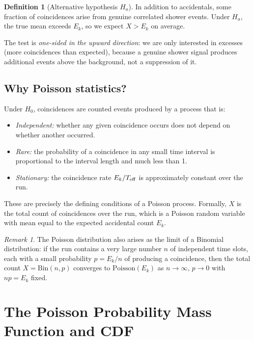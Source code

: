 \documentclass[12pt]{article}
\theoremstyle{definition}
\newtheorem{definition}{Definition}
\theoremstyle{remark}
\newtheorem{remark}{Remark}
\newcommand{\Ho}{H_0}
\newcommand{\Ha}{H_a}
\newcommand{\Eacc}{E}
\begin{document}
\begin{definition}[Alternative hypothesis $\Ha$]
  In addition to accidentals, some fraction of coincidences arise from
  genuine correlated shower events.  Under $\Ha$, the true mean exceeds
  $\Eacc_k$, so we expect $X > \Eacc_k$ on average.
\end{definition}

The test is \emph{one-sided in the upward direction}: we are only
interested in excesses (more coincidences than expected), because a
genuine shower signal produces additional events above the background,
not a suppression of it.

\subsection{Why Poisson statistics?}

Under $\Ho$, coincidences are counted events produced by a process that
is:
\begin{itemize}
  \item \textit{Independent:} whether any given coincidence occurs does
        not depend on whether another occurred.
  \item \textit{Rare:} the probability of a coincidence in any small
        time interval is proportional to the interval length and much
        less than 1.
  \item \textit{Stationary:} the coincidence rate $\Eacc_k / T_{\rm eff}$
        is approximately constant over the run.
\end{itemize}
These are precisely the defining conditions of a Poisson process.
Formally, $X$ is the total count of coincidences over the run, which is
a Poisson random variable with mean equal to the expected accidental
count $\Eacc_k$.

\begin{remark}
  The Poisson distribution also arises as the limit of a Binomial
  distribution: if the run contains a very large number $n$ of
  independent time slots, each with a small probability $p =
  \Eacc_k/n$ of producing a coincidence, then the total count $X =
  \mathrm{Bin}(n,p)$ converges to $\mathrm{Poisson}(\Eacc_k)$ as $n
  \to \infty$, $p \to 0$ with $np = \Eacc_k$ fixed.
\end{remark}

\section{The Poisson Probability Mass Function and CDF}
\end{document}
